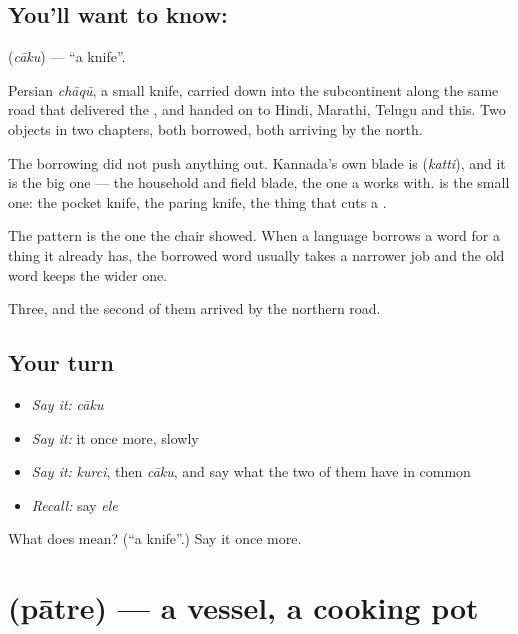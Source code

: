 \subsection*{You'll want to know: }
\textbf{} (\emph{cāku}) — \textquotedblleft{}a knife\textquotedblright{}.

Persian \emph{chāqū}, a small knife, carried down into the subcontinent along the same road that delivered the , and handed on to Hindi, Marathi, Telugu and this. Two objects in two chapters, both borrowed, both arriving by the north.

The borrowing did not push anything out. Kannada's own blade is  (\emph{katti}), and it is the big one — the household and field blade, the one a  works with.  is the small one: the pocket knife, the paring knife, the thing that cuts a .

The pattern is the one the chair showed. When a language borrows a word for a thing it already has, the borrowed word usually takes a narrower job and the old word keeps the wider one.

\begin{grammarlens}[title={What you've built}]
Three, and the second of them arrived by the northern road.
\end{grammarlens}

\subsection*{Your turn}
\begin{itemize}
\raggedright
  \item \emph{Say it:} \emph{cāku}
  \item \emph{Say it:} it once more, slowly
  \item \emph{Say it:} \emph{kurci}, then \emph{cāku}, and say what the two of them have in common
  \item \emph{Recall:} say \emph{ele}
\end{itemize}

\begin{tcolorbox}[breakable,colback=teal!4,colframe=teal!35!black,title={Before you move on}]
What does  mean? (\textquotedblleft{}a knife\textquotedblright{}.) Say it once more.
\end{tcolorbox}
\section[\texorpdfstring{\kn{ಪಾತ್ರೆ} (pātre)}{ಪಾತ್ರೆ (pātre)}]{ (pātre) — a vessel, a cooking pot}

